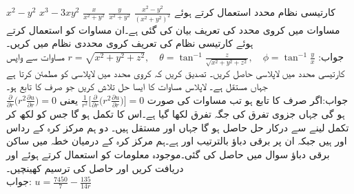 \quad
$x^2-y^2$
\quad
$x^3-3xy^2$
\quad
$\tfrac{x}{x^2+y^2}$
\quad
$\tfrac{y}{x^2+y^2}$
\quad
$\tfrac{x^2-y^2}{(x^2+y^2)^2}$
\quad
کارتیسی نظام محدد استعمال کرتے ہوئے مساوات  میں کروی محدد کی تعریف بیان کی گئی ہے۔ان مساوات کو استعمال کرتے ہوئے کارتیسی نظام کی تعریف کروی محددی نظام میں کریں۔\\
جواب:\quad
$r=\sqrt{x^2+y^2+z^2},\quad \theta=\tan^{-1}\frac{z}{\sqrt{x^2+y^2+z^2}},\quad \phi=\tan^{-1}\frac{y}{x}$
\quad
مساوات  سے واپس کارتیسی محدد میں لاپلاسی حاصل کریں۔
\quad
تصدیق کریں کہ  کروی محدد میں لاپلاسی کو مطمئن کرتا ہے جہاں  مستقل ہے۔
\quad
لاپلاس مساوات  کا ایسا حل تلاش کریں جو صرف  کا تابع ہو۔\\
جواب:\quad اگر  صرف  کا تابع ہو تب مساوات   کی صورت 
$\tfrac{1}{r^2}\big[\tfrac{\partial}{\partial r}\big(r^2\tfrac{\partial u}{\partial r}\big)\big]=0$
 یعنی
$ \tfrac{\partial}{\partial r}\big(r^2\tfrac{\partial u}{\partial r}\big)=0$
ہو گی جہاں جزوی تفرق کی جگہ تفرق لکھا گیا ہے۔اس کا تکمل ہو گا جس کو  لکھ کر تکمل لینے سے درکار حل  حاصل ہو گا جہاں  اور  مستقل ہیں۔
\quad دو ہم مرکز کرہ کے رداس  اور  ہیں جبکہ ان پر برقی دباؤ بالترتیب  اور  ہے۔ہم مرکز کرہ کے درمیان خطہ میں ساکن برقی دباؤ  سوال  میں حاصل کی گئی۔موجودہ معلومات کو استعمال کرتے ہوئے  اور  دریافت کریں اور حاصل  کی ترسیم کھینچیں۔\\
جواب:\quad
$u=\tfrac{7450}{7}-\tfrac{135}{14 r}$
\quad
